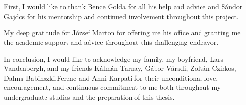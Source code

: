 \chapter*{\koszonetnyilvanitas}


First, I would like to thank  Bence Golda for all his help and advice and Sándor Gajdos for his mentorship and continued involvement throughout  this project. 

My deep  gratitude  for József Marton for offering me his office and granting me the academic support and advice throughout this challenging endeavor.  

In conclusion, I would like to acknowledge my family, my boyfriend, Lars Vandenbergh, and my friends Kálmán Tarnay, Gábor Váradi, Zoltán Czirkos, Dalma Babinszki,Ferenc and Anni  Karpati for their unconditional love, encouragement, and continuous  commitment to me both throughout my undergraduate studies  and the preparation of this thesis.